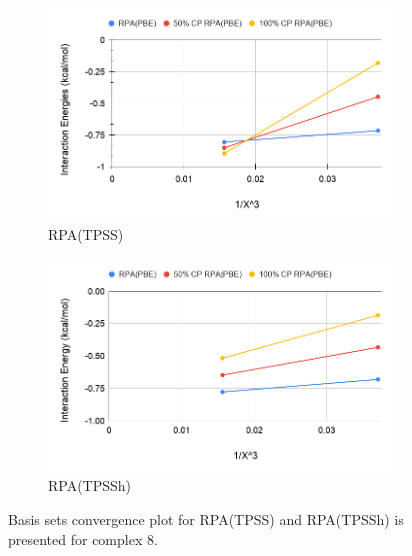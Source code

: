 \documentclass[11pt]{article}
\begin{document}
\begin{figure}[hbpt]
  \centering
  \begin{subfigure}{.5\textwidth}
    \center
    \includegraphics[scale=0.3]{tpss_8.png}
    \caption{RPA(TPSS)}
    \label{fig:tpss_8}
  \end{subfigure}%
  \begin{subfigure}{.5\textwidth}
    \center
    \includegraphics[scale=0.3]{tpssh_8.png}
    \caption{RPA(TPSSh)}
    \label{fig:tpssh_8}
  \end{subfigure}
  \caption{Basis sets convergence plot for RPA(TPSS) and RPA(TPSSh) is
    presented for complex 8.}
  \label{fig:complex_8}
\end{figure}
\end{document}
